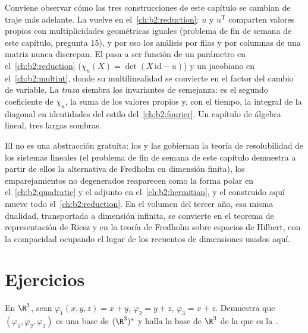\begin{remark}\label{rem:b2:linalg:perspectives}
Conviene observar cómo las tres construcciones de este capítulo se
cambian de traje más adelante. La \emph{} vuelve en el~\cref{ch:b2:reduction}: $u$ y $u^{\mathsf T}$ comparten valores
propios con multiplicidades geométricas iguales (problema de fin de
semana de este capítulo, pregunta 15), y por eso los análisis por
filas y por columnas de una matriz nunca discrepan. El
\emph{} pasa a ser función de un parámetro en el~\cref{ch:b2:reduction} ($\chi_u(X) = \det(X\,\mathrm{id} - u)$) y un
jacobiano en el~\cref{ch:b2:multint}, donde su multilinealidad se
convierte en el factor del cambio de variable. La \emph{traza}
siembra los invariantes de semejanza: es el segundo coeficiente de
$\chi_u$, la suma de los valores propios y, con el tiempo, la
integral de la diagonal en identidades del estilo del~\cref{ch:b2:fourier}. Un capítulo de álgebra lineal, tres largas
sombras.
\end{remark}

\begin{remark}
El  no es una abstracción gratuita: los  y
las  gobiernan la teoría de resolubilidad de los
sistemas lineales (el problema de fin de semana de este capítulo
demuestra a partir de ellos la alternativa de Fredholm en dimensión
finita), los emparejamientos no degenerados reaparecen como la forma
polar en el~\cref{ch:b2:quadratic} y el adjunto en el~\cref{ch:b2:hermitian}, y el  construido aquí mueve todo
el~\cref{ch:b2:reduction}. En el volumen del tercer año, esa misma
dualidad, transportada a dimensión infinita, se convierte en el
teorema de representación de Riesz y en la teoría de Fredholm sobre
espacios de Hilbert, con la compacidad ocupando el lugar de los
recuentos de dimensiones usados aquí.
\end{remark}

\section{Ejercicios}

\begin{exercise}[$\star$]\label{exo:b2:linalg:1}
En $\R^3$, sean $\varphi_1(x,y,z) = x + y$, $\varphi_2 = y + z$,
$\varphi_3 = x + z$. Demuestra que $(\varphi_1, \varphi_2,
\varphi_3)$ es una base de $(\R^3)^*$ y halla la base de $\R^3$ de la
que es la .
\end{exercise}

